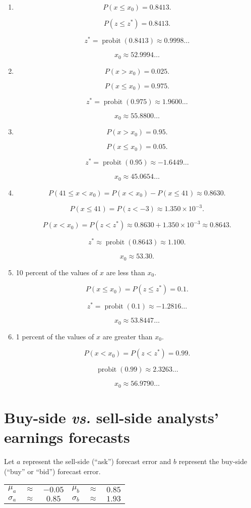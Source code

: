 \documentclass[12pt]{article}
\DeclareMathOperator{\probit}{probit}
\begin{document}
\begin{enumerate}
\item
\[P(x\leq x_0)=0.8413.\]

\[P(z\leq z^*)=0.8413.\]

\[z^*=\probit(0.8413)\approx 0.9998\dots\]

\[x_0\approx 52.9994\dots\]
\item
\[P(x>x_0)=0.025.\]

\[P(x\leq x_0)=0.975.\]

\[z^*=\probit(0.975)\approx 1.9600\dots\]

\[x_0\approx 55.8800\dots\]
\item
\[P(x>x_0)=0.95.\]

\[P(x\leq x_0)=0.05.\]

\[z^*=\probit(0.95)\approx -1.6449\dots\]

\[x_0\approx 45.0654\dots\]
\item
\[P(41\leq x<x_0)=P(x<x_0)-P(x\leq 41)\approx 0.8630.\]

\[P(x\leq 41)=P(z<-3)\approx 1.350\times 10^{-3}.\]

\[P(x<x_0)=P(z<z^*)\approx 0.8630+1.350\times 10^{-3}\approx 0.8643.\]

\[z^*\approx\probit(0.8643)\approx 1.100.\]

\[x_0\approx 53.30.\]
\item 10 percent of the values of $x$ are less than $x_0$.

\[P(x\leq x_0)=P(z\leq z^*)=0.1.\]

\[z^*=\probit(0.1)\approx -1.2816\dots\]

\[x_0\approx 53.8447\dots\]
\item 1 percent of the values of $x$ are greater than $x_0$.

\[P(x<x_0)=P(z<z^*)=0.99.\]

\[\probit(0.99)\approx 2.3263\dots\]

\[x_0\approx 56.9790\dots\]
\end{enumerate}
\section{Buy-side \emph{vs.} sell-side analysts' earnings forecasts}
Let $a$ represent the sell-side (``ask'') forecast error and $b$ represent the buy-side (``buy'' or ``bid'') forecast error.

\begin{center}
\begin{tabular}{cccccc}
$\mu_a$&$\approx$&$-0.05$&$\mu_b$&$\approx$&$0.85$\\

$\sigma_a$&$\approx$&$0.85$&$\sigma_b$&$\approx$&$1.93$
\end{tabular}
\end{center}
\end{document}
